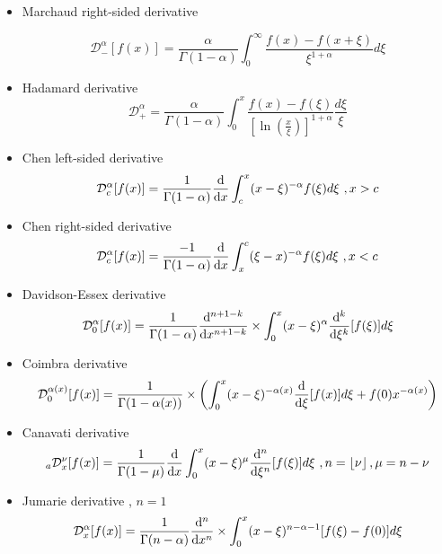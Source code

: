 \documentclass[twoside]{book}
\begin{document}
{\begin{itemize}
          \begin{equation}
              \mathcal{D}^{\alpha}_{+}[f(x)]=\frac{\alpha}{\Gamma{(1-\alpha)}} \int_0^\infty \frac{f(x)-f(x-\xi)}{\xi^{1+\alpha}} d\xi
          \end{equation}
    \item Marchaud right-sided derivative

          \begin{equation}
              \mathcal{D}^{\alpha}_{-}[f(x)]=\frac{\alpha}{\Gamma{(1-\alpha)}} \int_0^\infty \frac{f(x)-f(x+\xi)}{\xi^{1+\alpha}} d\xi
          \end{equation}
    \item Hadamard derivative
          \begin{equation}
              \mathcal{D}^{\alpha}_{+} = \frac{\alpha}{\Gamma{(1-\alpha)}} \int_0^x \frac{f(x)-f(\xi)}{[\ln{(\frac{x}{\xi})}]^{1+\alpha}} \frac{d\xi}{\xi}
          \end{equation}
    \item Chen left-sided derivative
          \begin{equation}
              \mathcal{D}^{\alpha}_{c} [f(x)] = \frac{1}{\Gamma{(1-\alpha)}} \dv{}{x} \int_c^x  (x-\xi)^{-\alpha} f(\xi) d\xi \,\, , x>c
          \end{equation}
    \item Chen right-sided derivative
          \begin{equation}
              \mathcal{D}^{\alpha}_{c}[f(x)] = \frac{-1}{\Gamma{(1-\alpha)}} \dv{}{x} \int_x^c  (\xi-x)^{-\alpha} f(\xi) d\xi \,\, , x<c
          \end{equation}
    \item Davidson-Essex derivative
          \begin{equation}
              \mathcal{D}^{\alpha}_{0}[f(x)] = \frac{1}{\Gamma{(1-\alpha)}} \dv[n+1-k]{}{x} \times \int_0^x (x-\xi)^{\alpha} \dv[k]{}{\xi}[f(\xi)] d\xi
          \end{equation}
    \item Coimbra derivative
          \begin{equation}
              \mathcal{D}^{\alpha(x)}_{0}[f(x)] = \frac{1}{\Gamma{(1-\alpha(x))}} \times \left( \int_0^x (x-\xi)^{-\alpha(x)} \dv{}{\xi} [f(x)] d\xi + f(0) x^{-\alpha(x)} \right)
          \end{equation}
    \item Canavati derivative
          \begin{equation}
              _{a}\mathcal{D}^{\nu}_{x}[f(x)] = \frac{1}{\Gamma{(1-\mu)}} \dv{}{x} \int_0^x (x-\xi)^\mu \dv[n]{}{\xi} [f(\xi)] d\xi \,\, , n= \lfloor \nu \rfloor \,, \mu=n-\nu
          \end{equation}
    \item Jumarie derivative , $n=1$
          \begin{equation}
              \mathcal{D}^{\alpha}_{x}[f(x)] = \frac{1}{\Gamma{(n-\alpha)}} \dv[n]{}{x} \times \int_0^x (x-\xi)^{n-\alpha-1}[f(\xi)-f(0)] d\xi
          \end{equation}


\end{itemize}}
\end{document}
